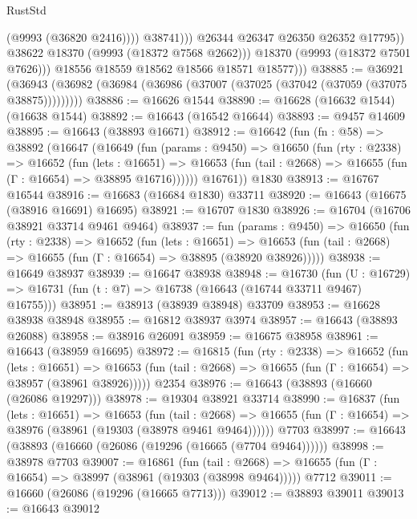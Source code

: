\begin{lexlean}{RustStd}
\begin{coremodule}
                            (@9993 (@36820 @2416))))
                        @38741)))
                  @26344
                  @26347
                  @26350
                  @26352
                  @17795))
              @38622
              @18370
              (@9993 (@18372 @7568 @2662)))
            @18370
            (@9993 (@18372 @7501 @7626)))
          @18556
          @18559
          @18562
          @18566
          @18571
          @18577)))
@38885 := @36921
    (@36943 (@36982 (@36984 (@36986 (@37007 (@37025 (@37042 (@37059 (@37075 @38875)))))))))
@38886 := @16626 @1544
@38890 := @16628 (@16632 @1544) (@16638 @1544)
@38892 := @16643 (@16542 @16644)
@38893 := @9457 @14609
@38895 := @16643 (@38893 @16671)
@38912 := @16642
    (fun (fn : @58) =>
    @38892
      (@16647
        (@16649
          (fun (params : @9450) =>
          @16650
            (fun (rty : @2338) =>
            @16652
              (fun (lets : @16651) =>
              @16653 (fun (tail : @2668) => @16655 (fun (Γ : @16654) => @38895 @16716))))))
        @16761))
    @1830
@38913 := @16767 @16544
@38916 := @16683 (@16684 @1830) @33711
@38920 := @16643 (@16675 (@38916 @16691) @16695)
@38921 := @16707 @1830
@38926 := @16704 (@16706 @38921 @33714 @9461 @9464)
@38937 := fun (params : @9450) =>
  @16650
    (fun (rty : @2338) =>
    @16652
      (fun (lets : @16651) =>
      @16653 (fun (tail : @2668) => @16655 (fun (Γ : @16654) => @38895 (@38920 @38926)))))
@38938 := @16649 @38937
@38939 := @16647 @38938
@38948 := @16730
    (fun (U : @16729) => @16731 (fun (t : @7) => @16738 (@16643 (@16744 @33711 @9467) @16755)))
@38951 := @38913 (@38939 @38948) @33709
@38953 := @16628 @38938 @38948
@38955 := @16812 @38937 @3974
@38957 := @16643 (@38893 @26088)
@38958 := @38916 @26091
@38959 := @16675 @38958
@38961 := @16643 (@38959 @16695)
@38972 := @16815
    (fun (rty : @2338) =>
    @16652
      (fun (lets : @16651) =>
      @16653 (fun (tail : @2668) => @16655 (fun (Γ : @16654) => @38957 (@38961 @38926)))))
    @2354
@38976 := @16643 (@38893 (@16660 (@26086 @19297)))
@38978 := @19304 @38921 @33714
@38990 := @16837
    (fun (lets : @16651) =>
    @16653
      (fun (tail : @2668) =>
      @16655 (fun (Γ : @16654) => @38976 (@38961 (@19303 (@38978 @9461 @9464))))))
    @7703
@38997 := @16643 (@38893 (@16660 (@26086 (@19296 (@16665 (@7704 @9464))))))
@38998 := @38978 @7703
@39007 := @16861
    (fun (tail : @2668) => @16655 (fun (Γ : @16654) => @38997 (@38961 (@19303 (@38998 @9464)))))
    @7712
@39011 := @16660 (@26086 (@19296 (@16665 @7713)))
@39012 := @38893 @39011
@39013 := @16643 @39012

\end{coremodule}
\end{lexlean}
